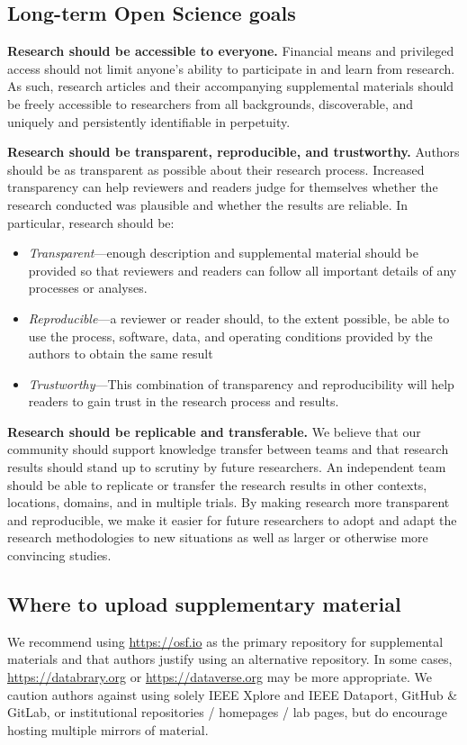 \documentclass[journal]{vgtc}                %
\begin{document}
\subsection{Long-term Open Science goals}

\textbf{Research should be accessible to everyone.}
Financial means and privileged access should not limit anyone's ability to participate in and learn from research.
As such, research articles and their accompanying supplemental materials should be freely accessible to researchers from all backgrounds, discoverable, and uniquely and persistently identifiable in perpetuity.

\textbf{Research should be transparent, reproducible, and trustworthy.}
Authors should be as transparent as possible about their research process.
Increased transparency can help reviewers and readers judge for themselves whether the research conducted was plausible and whether the results are reliable.
In particular, research should be:
\begin{itemize}
	\item \textit{Transparent}---enough description and supplemental material should be provided so that reviewers and readers can follow all important details of any processes or analyses.
	
	\item \textit{Reproducible}---a reviewer or reader should, to the extent possible, be able to use the process, software, data, and operating conditions provided by the authors to obtain the same result
	
	\item \textit{Trustworthy}---This combination of transparency and reproducibility will help readers to gain trust in the research process and results.
\end{itemize}
	
\textbf{Research should be replicable and transferable.}
We believe that our community should support knowledge transfer between teams and that research results should stand up to scrutiny by future researchers. An independent team should be able to replicate or transfer the research results in other contexts, locations, domains, and in multiple trials. By making research more transparent and reproducible, we make it easier for future researchers to adopt and adapt the research methodologies to new situations as well as larger or otherwise more convincing studies.

\subsection{Where to upload supplementary material}
We recommend using \url{https://osf.io} as the primary repository for supplemental materials and that authors justify using an alternative repository.
In some cases, \url{https://databrary.org} or \url{https://dataverse.org} may be more appropriate.
We caution authors against using solely IEEE Xplore and IEEE Dataport, GitHub \& GitLab, or institutional repositories / homepages / lab pages, but do encourage hosting multiple mirrors of material.
\end{document}
